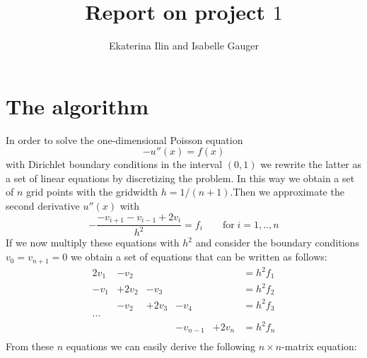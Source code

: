 \documentclass[11pt,a4wide]{article}
\begin{document}
\title{Report on project $1$}
\author{Ekaterina Ilin and Isabelle Gauger}
\maketitle
\tableofcontents
\newpage
\section{The algorithm}
In order to solve the one-dimensional Poisson equation
\begin{equation}
-u''(x)=f(x)
\label{eq:1}
\end{equation}
with Dirichlet boundary conditions in the interval $(0,1)$ we rewrite the latter as a set of linear equations by discretizing the problem. In this way we obtain a set of $n$ grid points with the gridwidth $h=1/(n+1)$.Then we approximate the second derivative $u''(x)$ with
\begin{equation}
-\dfrac{-v_{i+1}-v_{i-1}+2v_i}{h^2}=f_i\qquad \text{for}\; i=1,..,n
\label{eq:2}
\end{equation}
If we now multiply these equations with $h^2$ and consider the boundary conditions \mbox{$v_0=v_{n+1}=0$} we obtain a set of equations that can be written as follows:
\begin{equation}
 \begin{matrix}
2v_1 & - v_2 &          &               &          &=h^2f_1 \\
 -v_1 & +2v_2 & -v_3  &               &          &=h^2f_2 \\
         &  -v_2 & +2v_3 & -v_4       &          & =h^2f_3\\
...\\ 
         &           &          & -v_{n-1}& +2v_n & =h^2f_n\\
 \end{matrix}
\label{eq:2.2}
\end{equation}
From these $n$ equations we can easily derive the following $n\times n$-matrix equation:
\end{document}
